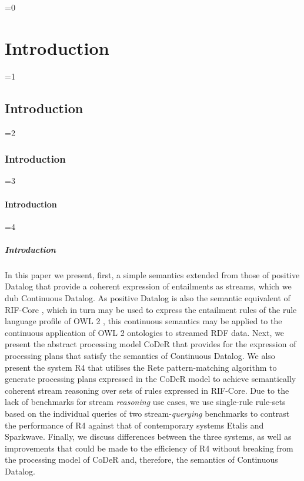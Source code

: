 \documentclass[twocolumn,preprint,3p,number]{elsarticle}
\theoremstyle{plain}
\theoremstyle{definition}
\newcounter{nestingdepth}
\newenvironment{nestedsection}[2]{
  \ifnum\value{nestingdepth}=0
    \chapter{#1}
  \else
    \ifnum\value{nestingdepth}=1
      \section{#1}
    \else
      \ifnum\value{nestingdepth}=2
        \subsection{#1}
      \else
        \ifnum\value{nestingdepth}=3
          \subsubsection{#1}
        \else
          \ifnum\value{nestingdepth}=4
            \paragraph{#1}
          \else
            \PackageError{nestedsections}{Maximum nesting level exceeded!}{uh oh!}
          \fi
        \fi
      \fi
    \fi
  \fi
  \addtocounter{nestingdepth}{1}
  \label{sec:#2}
}{\addtocounter{nestingdepth}{-1}}
\begin{document}
\begin{nestedsection}{Introduction}{intro}
  In this paper we present, first, a simple semantics extended from those of positive Datalog that provide a coherent expression of entailments as streams, which we dub Continuous Datalog.
  As positive Datalog is also the semantic equivalent of RIF-Core \citep{w3crifcore}, which in turn may be used to express the entailment rules of the rule language profile of OWL 2 \citep{w3cowl2profiles}, this continuous semantics may be applied to the continuous application of OWL 2 ontologies to streamed RDF data.
  Next, we present the abstract processing model CoDeR that provides for the expression of processing plans that satisfy the semantics of Continuous Datalog.
  We also present the system R4 that utilises the Rete pattern-matching algorithm to generate processing plans expressed in the CoDeR model to achieve semantically coherent stream reasoning over sets of rules expressed in RIF-Core.
  Due to the lack of benchmarks for stream \emph{reasoning} use cases, we use single-rule rule-sets based on the individual queries of two stream-\emph{querying} benchmarks to contrast the performance of R4 against that of contemporary systems Etalis and Sparkwave.
  Finally, we discuss differences between the three systems, as well as improvements that could be made to the efficiency of R4 without breaking from the processing model of CoDeR and, therefore, the semantics of Continuous Datalog.
\end{nestedsection}
\end{document}
